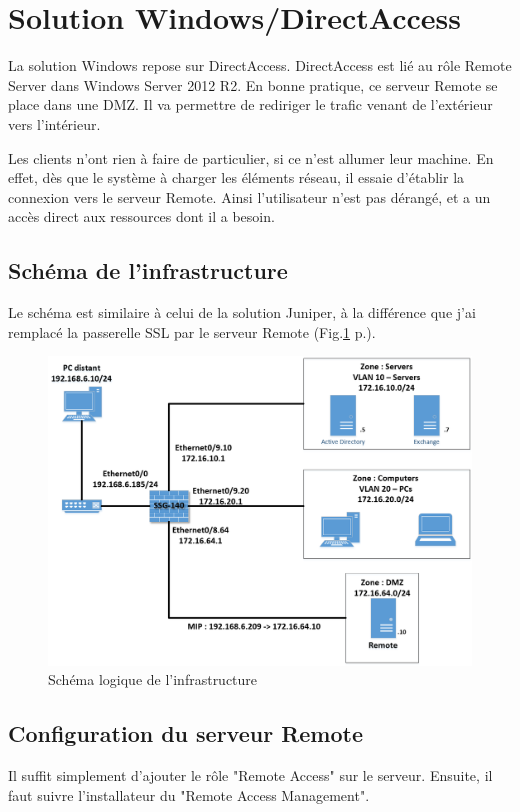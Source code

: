 \section{Solution Windows/DirectAccess}
La solution Windows repose sur DirectAccess.
DirectAccess est lié au rôle Remote Server dans Windows Server 2012 R2.
En bonne pratique, ce serveur Remote se place dans une DMZ.
Il va permettre de rediriger le trafic venant de l'extérieur vers l'intérieur. 

Les clients n'ont rien à faire de particulier, si ce n'est allumer leur machine.
En effet, dès que le système à charger les éléments réseau, il essaie d'établir la connexion vers le serveur Remote.
Ainsi l'utilisateur n'est pas dérangé, et a un accès direct aux ressources dont il a besoin.

\subsection{Schéma de l'infrastructure}
Le schéma est similaire à celui de la solution Juniper, à la différence que j'ai remplacé la passerelle SSL par le serveur Remote (Fig.\ref{fig:schemaDA} p.\pageref{fig:schemaDA}).

\begin{figure}[ht]
	\centering
	\includegraphics[width=16cm]{DA/schema.png}
	\caption{Schéma logique de l'infrastructure}
	\label{fig:schemaDA}
\end{figure}

\subsection{Configuration du serveur Remote}
Il suffit simplement d'ajouter le rôle "Remote Access" sur le serveur.
Ensuite, il faut suivre l'installateur du "Remote Access Management".

